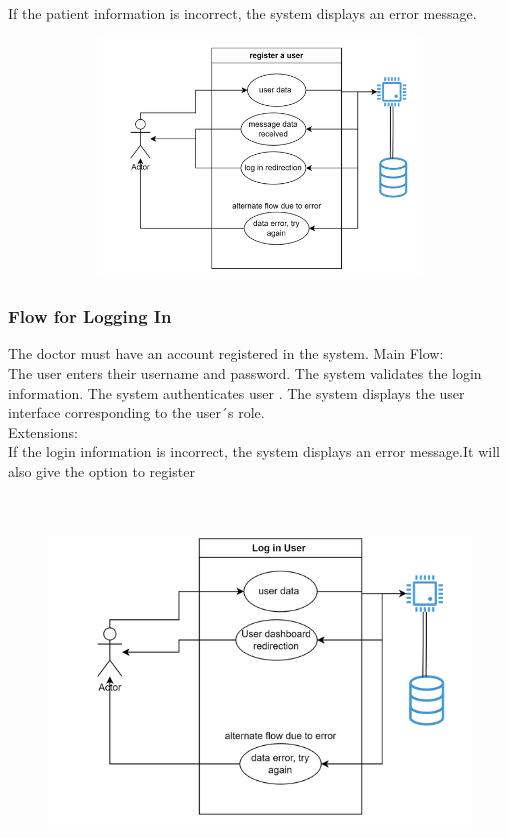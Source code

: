 \documentclass{scrreprt}
\begin{document}
	If the patient information is incorrect, the system displays an error message.
	
	\begin{figure}[h]
		\begin{center}
			\includegraphics[width=350pt,height=180pt]{usuario1.png}
		\end{center}
		\label{fig:Use case 1}
	\end{figure}
	\pagebreak
	\subsubsection{Flow for Logging In}
	The doctor  must have an account registered in the system.
	Main Flow:\\
	
	The  user enters their username and password.
	The system validates the login information.
	The system authenticates user .
	The system displays the user interface corresponding to the user´s role.\\
	Extensions:\\
	
	If the login information is incorrect, the system displays an error message.It will also give the option to register 
	\begin{figure}[h]
		\begin{center}
			\includegraphics[width=350pt,height=280pt]{usuario2.png}
		\end{center}
		\label{fig:Use case 2}
	\end{figure}
	\pagebreak
\end{document}

